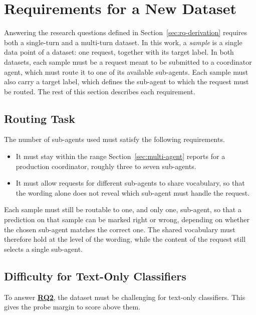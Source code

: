 \section{Requirements for a New Dataset}
\label{sec:dataset-requirements}

Answering the research questions defined in Section~\ref{sec:rq-derivation} requires both a single-turn and a multi-turn dataset. In this work, a \emph{sample} is a single data point of a dataset: one request, together with its target label. In both datasets, each sample must be a request meant to be submitted to a coordinator agent, which must route it to one of its available sub-agents. Each sample must also carry a target label, which defines the sub-agent to which the request must be routed. The rest of this section describes each requirement.

\subsection{Routing Task}
\label{subsec:routing-setup}

The number of sub-agents used must satisfy the following requirements.

\begin{itemize}
    \item It must stay within the range Section~\ref{sec:multi-agent} reports for a production coordinator, roughly three to seven sub-agents.
    \item It must allow requests for different sub-agents to share vocabulary, so that the wording alone does not reveal which sub-agent must handle the request.
\end{itemize}

Each sample must still be routable to one, and only one, sub-agent, so that a prediction on that sample can be marked right or wrong, depending on whether the chosen sub-agent matches the correct one. The shared vocabulary must therefore hold at the level of the wording, while the content of the request still selects a single sub-agent.

\subsection{Difficulty for Text-Only Classifiers}
\label{subsec:lexical-separability}

To answer \hyperref[rq:rq2]{\textbf{RQ2}}, the dataset must be challenging for text-only classifiers. This gives the probe margin to score above them.

